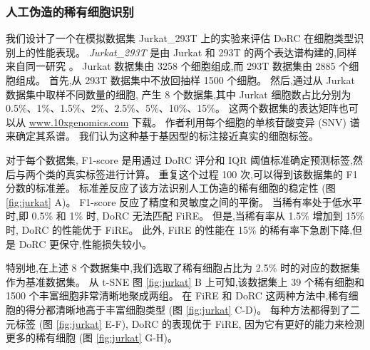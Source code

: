 \subsubsection{人工伪造的稀有细胞识别}
\label{subsec:recplanted} 


我们设计了一个在模拟数据集 Jurkat\_293T 上的实验来评估 DoRC 在细胞类型识别上的性能表现。
 \textit{Jurkat\_293T} 是由 Jurkat 和 293T 的两个表达谱构建的,同样来自同一研究 \cite{zheng2017massively}。
Jurkat 数据集由 3258 个细胞组成,而 293T 数据集由 2885 个细胞组成。
首先,从 293T 数据集中不放回抽样 1500 个细胞。
然后,通过从 Jurkat 数据集中取样不同数量的细胞,
产生 8 个数据集,其中 Jurkat 细胞数占比分别为 0.5\%、1\%、1.5\%、2\%、2.5\%、5\%、10\%、15\%。
这两个数据集的表达矩阵也可以从 \url{www.10xgenomics.com} 下载。
作者利用每个细胞的单核苷酸变异 (SNV) 谱来确定其系谱。
我们认为这种基于基因型的标注接近真实的细胞标签。

对于每个数据集, F1-score 是用通过 DoRC 评分和 IQR 阈值标准确定预测标签,然后与两个类的真实标签进行计算。
重复这个过程 100 次,可以得到该数据集的 F1 分数的标准差。
标准差反应了该方法识别人工伪造的稀有细胞的稳定性 (图 \ref{fig:jurkat} A)。 
F1-score 反应了精度和灵敏度之间的平衡。
当稀有率处于低水平时,即 0.5\% 和 1\% 时, DoRC 无法匹配 FiRE。
但是,当稀有率从 1.5\% 增加到 15\% 时, DoRC 的性能优于 FiRE。
此外, FiRE 的性能在 15\% 的稀有率下急剧下降,但是 DoRC 更保守,性能损失较小。

特别地,在上述 8 个数据集中,我们选取了稀有细胞占比为 2.5\% 时的对应的数据集作为基准数据集。
从 t-SNE 图 \ref{fig:jurkat} B 上可知,该数据集上 39 个稀有细胞和 1500 个丰富细胞非常清晰地聚成两组。
在 FiRE 和 DoRC 这两种方法中,稀有细胞的得分都清晰地高于丰富细胞类型 (图 \ref{fig:jurkat} C-D)。
每种方法都得到了二元标签 (图 \ref{fig:jurkat} E-F), DoRC 的表现优于 FiRE,
因为它有更好的能力来检测更多的稀有细胞 (图 \ref{fig:jurkat} G-H)。

